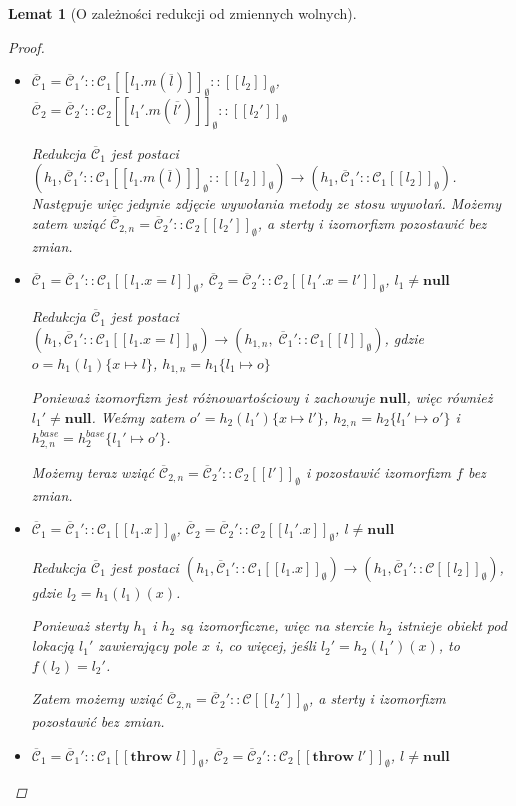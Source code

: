 \documentclass[]{pracamgr}
\renewcommand \| {\hspace{0.75em} | \hspace{0.75em} }
\renewcommand \[ {[\![}
\renewcommand \] {]\!]}
\newtheorem{lemma}{Lemat}
\theoremstyle{definition}
\newcommand{\jthrow}{\mathbf{throw}\xspace}
\newcommand{\jnull}{\mathbf{null}\xspace}
\newcommand{\throwin}[1]{\jthrow\; #1\xspace}
\newcommand{\ctxt}{\mathcal{C}\xspace}
\newcommand{\ctxts}{\overline{\ctxt}}
\begin{document}
\begin{lemma}[O zależności redukcji od zmiennych wolnych]{\ }
\begin{proof}
\begin{itemize}
\item $\ctxts_1 = \ctxts_1'::\ctxt_1\[ l_1.m(\overline{l})\]_\emptyset :: \[ l_2 \]_\emptyset$, \;\;
      $\ctxts_2 = \ctxts_2'::\ctxt_2\[ l_1'.m(\overline{l'})\]_\emptyset :: \[ l_2' \]_\emptyset$
      
Redukcja $\ctxts_1$ jest postaci
$(h_1, \ctxts_1'::\ctxt_1\[ l_1.m(\overline{l})\]_\emptyset :: \[ l_2 \]_\emptyset) \rightarrow
 (h_1, \ctxts_1'::\ctxt_1\[ l_2\]_\emptyset)$.
Następuje więc jedynie zdjęcie wywołania metody ze stosu wywołań.
Możemy zatem wziąć
$\ctxts_{2,n} = \ctxts_2'::\ctxt_2\[ l_2'\]_\emptyset$, a sterty i izomorfizm pozostawić bez zmian.

\item $\ctxts_1 = \ctxts_1'::\ctxt_1\[ l_1.x = l\]_\emptyset$, \;\;
      $\ctxts_2 = \ctxts_2'::\ctxt_2\[ l_1'.x = l'\]_\emptyset$, \;\;
      $l_1 \neq \jnull$
      
Redukcja $\ctxts_1$ jest postaci
$(h_1,  \ctxts_1'::\ctxt_1\[ l_1.x = l\]_\emptyset) \rightarrow
 (h_{1, n},\; \ctxts_1'::\ctxt_1\[ l\]_\emptyset)$, gdzie
$o = h_1(l_1)\{x \mapsto  l\}$, $h_{1,n} = h_1\{l_1 \mapsto o\}$

Ponieważ izomorfizm jest różnowartościowy i zachowuje $\jnull$, więc również $l_1' \neq \jnull$.
Weźmy zatem
$o' = h_2(l_1')\{x \mapsto  l'\}$, $h_{2,n} = h_2\{l_1' \mapsto o'\}$ i
$h_{2,n}^{base} = h_2^{base}\{l_1' \mapsto o'\}$.

Możemy teraz wziąć $\ctxts_{2,n} = \ctxts_2'::\ctxt_2\[ l'\]_\emptyset$ i
pozostawić izomorfizm $f$ bez zmian.

\item $\ctxts_1 = \ctxts_1'::\ctxt_1\[ l_1.x\]_\emptyset$, \;\;
      $\ctxts_2 = \ctxts_2'::\ctxt_2\[ l_1'.x\]_\emptyset$, \;\;
      $l \neq \jnull$
      
Redukcja $\ctxts_1$ jest postaci
$(h_1, \ctxts_1'::\ctxt_1\[ l_1.x\]_\emptyset) \rightarrow
 (h_1, \ctxts_1'::\ctxt\[ l_2\]_\emptyset)$,
gdzie $l_2=h_1(l_1)(x)$.

Ponieważ sterty $h_1$ i $h_2$ są izomorficzne, więc na stercie $h_2$ istnieje obiekt pod lokacją
$l_1'$ zawierający pole $x$ i, co więcej, jeśli $l_2' = h_2(l_1')(x)$, to $f(l_2) = l_2'$.

Zatem możemy wziąć $\ctxts_{2, n} = \ctxts_2'::\ctxt\[ l_2'\]_\emptyset$, a sterty
i izomorfizm pozostawić bez zmian.

\item $\ctxts_1 = \ctxts_1'::\ctxt_1\[ \throwin{l}\]_\emptyset$, \;\;
      $\ctxts_2 = \ctxts_2'::\ctxt_2\[ \throwin{l'}\]_\emptyset$, \;\;
      $l \neq \jnull$


\end{itemize}
\end{proof}
\end{lemma}
\end{document}
